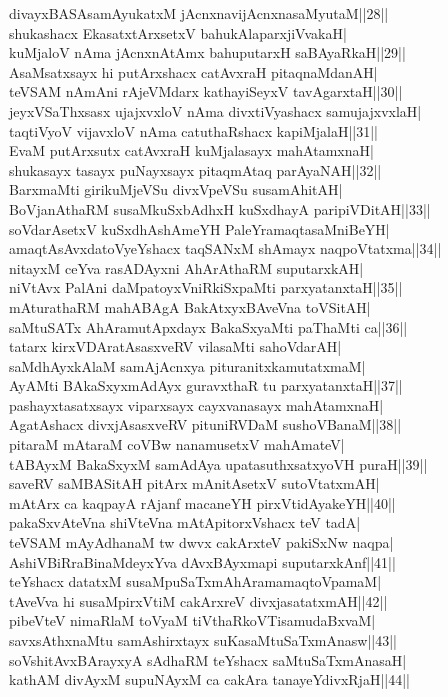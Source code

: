\documentclass{article}
\begin{document}
divayxBASAsamAyukatxM jAcnxnavijAcnxnasaMyutaM||28||\\
shukashacx EkasatxtArxsetxV bahukAlaparxjiVvakaH|\\
kuMjaloV nAma jAcnxnAtAmx bahuputarxH saBAyaRkaH||29||\\
AsaMsatxsayx hi putArxshacx catAvxraH pitaqnaMdanAH|\\
teVSAM nAmAni rAjeVMdarx kathayiSeyxV tavAgarxtaH||30||\\
jeyxVSaThxsasx ujajxvxloV nAma divxtiVyashacx samujajxvxlaH|\\
taqtiVyoV vijavxloV nAma catuthaRshacx kapiMjalaH||31||\\
EvaM putArxsutx catAvxraH kuMjalasayx mahAtamxnaH|\\
shukasayx tasayx puNayxsayx pitaqmAtaq parAyaNAH||32||\\
BarxmaMti girikuMjeVSu divxVpeVSu susamAhitAH|\\
BoVjanAthaRM susaMkuSxbAdhxH kuSxdhayA paripiVDitAH||33||\\
soVdarAsetxV kuSxdhAshAmeYH PaleYramaqtasaMniBeYH|\\
amaqtAsAvxdatoVyeYshacx taqSANxM shAmayx naqpoVtatxma||34||\\
nitayxM ceYva rasADAyxni AhArAthaRM suputarxkAH|\\
niVtAvx PalAni daMpatoyxVniRkiSxpaMti parxyatanxtaH||35||\\
mAturathaRM mahABAgA BakAtxyxBAveVna toVSitAH|\\
saMtuSATx AhAramutApxdayx BakaSxyaMti paThaMti ca||36||\\
tatarx kirxVDAratAsasxveRV vilasaMti sahoVdarAH|\\
saMdhAyxkAlaM samAjAcnxya pituranitxkamutatxmaM|\\
AyAMti BAkaSxyxmAdAyx guravxthaR tu parxyatanxtaH||37||\\
pashayxtasatxsayx viparxsayx cayxvanasayx mahAtamxnaH|\\
AgatAshacx divxjAsasxveRV pituniRVDaM sushoVBanaM||38||\\
pitaraM mAtaraM coVBw nanamusetxV mahAmateV|\\
tABAyxM BakaSxyxM samAdAya upatasuthxsatxyoVH puraH||39||\\
saveRV saMBASitAH pitArx mAnitAsetxV sutoVtatxmAH|\\
mAtArx ca kaqpayA rAjanf macaneYH pirxVtidAyakeYH||40||\\
pakaSxvAteVna shiVteVna mAtApitorxVshacx teV tadA|\\
teVSAM mAyAdhanaM tw dwvx cakArxteV pakiSxNw naqpa|\\
AshiVBiRraBinaMdeyxYva dAvxBAyxmapi suputarxkAnf||41||\\
teYshacx datatxM susaMpuSaTxmAhAramamaqtoVpamaM|\\
tAveVva hi susaMpirxVtiM cakArxreV divxjasatatxmAH||42||\\
pibeVteV nimaRlaM toVyaM tiVthaRkoVTisamudaBxvaM|\\
savxsAthxnaMtu samAshirxtayx suKasaMtuSaTxmAnasw||43||\\
soVshitAvxBArayxyA sAdhaRM teYshacx saMtuSaTxmAnasaH|\\
kathAM divAyxM supuNAyxM ca cakAra tanayeYdivxRjaH||44||\\
\end{document}
